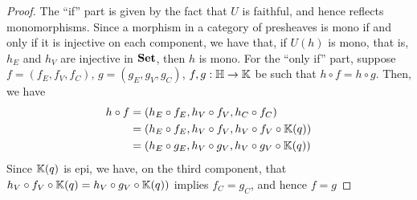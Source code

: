 \begin{proof}
    The ``if'' part is given by the fact that $U$ is faithful, and hence reflects monomorphisms. Since a morphism in a category of presheaves is mono if and only if it is injective on each component, we have that, if  $U(h)$ is mono, that is, $h_E$ and $h_V$ are injective in $\mathbf{Set}$, then $h$ is mono.
    For the ``only if'' part, suppose $f = (f_E, f_V, f_C)$, $g=(g_E, g_V, g_C)$, $f, g : \mathbb{H \to K}$ be such that $h \circ f = h \circ g$. Then, we have
    \begin{align*}
        h \circ f   &= (h_E \circ f_E, h_V \circ f_V, h_C \circ f_C) \\
                    &= (h_E \circ f_E, h_V \circ f_V, h_V \circ f_V \circ \mathbb{K}(q)) \\
                    &= (h_E \circ g_E, h_V \circ g_V, h_V \circ g_V \circ \mathbb{K}(q))
    \end{align*}    
    Since $\mathbb{K}(q)$ is epi, we have, on the third component, that $h_V \circ f_V \circ \mathbb{K}(q) = h_V \circ g_V \circ \mathbb{K}(q))$ implies $f_C = g_C$, and hence $f = g$    
\end{proof}

